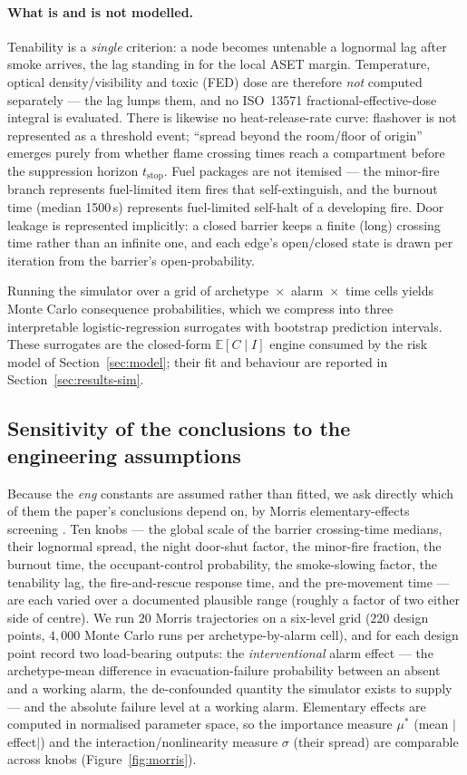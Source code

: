 \paragraph{What is and is not modelled.}
Tenability is a \emph{single} criterion: a node becomes untenable a lognormal lag
after smoke arrives, the lag standing in for the local ASET margin. Temperature,
optical density/visibility and toxic (FED) dose are therefore \emph{not} computed
separately --- the lag lumps them, and no ISO~13571 fractional-effective-dose
integral is evaluated. There is likewise no heat-release-rate curve: flashover is
not represented as a threshold event; ``spread beyond the room/floor of origin''
emerges purely from whether flame crossing times reach a compartment before the
suppression horizon $t_{\text{stop}}$. Fuel packages are not itemised --- the
minor-fire branch represents fuel-limited item fires that self-extinguish, and the
burnout time (median 1500\,s) represents fuel-limited self-halt of a developing
fire. Door leakage is represented implicitly: a closed barrier keeps a finite
(long) crossing time rather than an infinite one, and each edge's open/closed
state is drawn per iteration from the barrier's open-probability.

Running the simulator over a grid of archetype~$\times$~alarm~$\times$~time cells
yields Monte Carlo consequence probabilities, which we compress into three
interpretable logistic-regression surrogates with bootstrap prediction intervals.
These surrogates are the closed-form $\mathbb{E}[C\mid I]$ engine consumed by the
risk model of Section~\ref{sec:model}; their fit and behaviour are reported in
Section~\ref{sec:results-sim}.

\subsection{Sensitivity of the conclusions to the engineering assumptions}
\label{sec:surrogate-sensitivity}

Because the \emph{eng} constants are assumed rather than fitted, we ask directly
which of them the paper's conclusions depend on, by Morris elementary-effects
screening \citep{morris1991,campolongo2007}. Ten knobs --- the global scale of
the barrier crossing-time medians, their lognormal spread, the night door-shut
factor, the minor-fire fraction, the burnout time, the occupant-control
probability, the smoke-slowing factor, the tenability lag, the fire-and-rescue
response time, and the pre-movement time --- are each varied over a documented
plausible range (roughly a factor of two either side of centre). We run $20$
Morris trajectories on a six-level grid ($220$ design points, $4{,}000$ Monte
Carlo runs per archetype-by-alarm cell), and for each design point record two
load-bearing outputs: the \emph{interventional} alarm effect --- the
archetype-mean difference in evacuation-failure probability between an absent and
a working alarm, the de-confounded quantity the simulator exists to supply --- and
the absolute failure level at a working alarm. Elementary effects are computed in
normalised parameter space, so the importance measure $\mu^\ast$ (mean $|$effect$|$)
and the interaction/nonlinearity measure $\sigma$ (their spread) are comparable
across knobs (Figure~\ref{fig:morris}).

